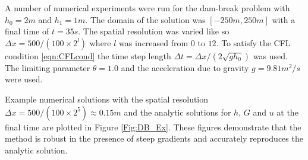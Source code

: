 \documentclass[10pt]{elsarticle}
\begin{document}
A number of numerical experiments were run for the dam-break problem with $h_0 = 2m$ and $h_1 = 1m$. The domain of the solution was $\left[-250m,250m\right]$ with a final time of $t=35s$.  The spatial resolution was varied like so $\Delta x = 500 / (100 \times 2^{l})$ where $l$ was increased from $0$ to $12$. To satisfy the CFL condition \eqref{eqn:CFLcond} the time step length $\Delta t = \Delta x  / \left( 2 \sqrt{g h_0}\right)$ was used. The limiting parameter $\theta = 1.0$ and the acceleration due to gravity $g = 9.81 m^2/s$ were used. 

Example numerical solutions with the spatial resolution $\Delta x = 500 / (100 \times 2^{5}) \approx  0.15m$ and the analytic solutions for $h$, $G$ and $u$ at the final time are plotted in Figure \ref{Fig:DB_Ex}. These figures demonstrate that the method is robust in the presence of steep gradients and accurately reproduces the analytic solution. 
%
\end{document}
